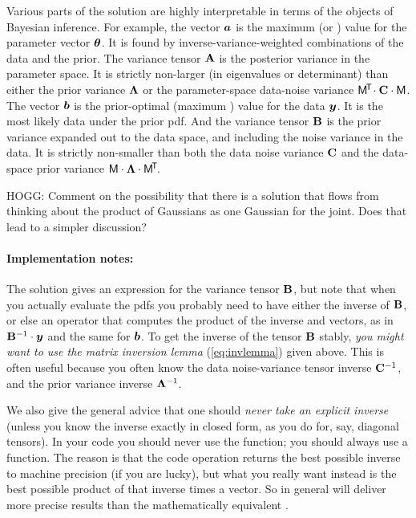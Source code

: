 Various parts of the solution are highly interpretable in terms of the
objects of Bayesian inference. For example, the vector $\boldsymbol{a}$ is the
maximum  (or ) value for the parameter vector
$\boldsymbol{\theta}$.
It is found by inverse-variance-weighted combinations of the data and the prior.
The variance tensor $\mathbf{A}$ is the posterior variance in the parameter space.
It is strictly non-larger (in eigenvalues or determinant) than either
the prior variance $\mathbf{\Lambda}$ or the parameter-space data-noise
variance $\mathsf{M}^{\!\mathsf{T}\!}\cdot\mathbf{C}\cdot\mathsf{M}$.
The vector $\boldsymbol{b}$ is the prior-optimal (maximum )
value for the data $\boldsymbol{y}$.
It is the most likely data under the prior pdf.
And the variance tensor $\mathbf{B}$ is the prior variance expanded out to the
data space, and including the noise variance in the data.
It is strictly non-smaller than both the data noise variance $\mathbf{C}$ and the
data-space prior variance $\mathsf{M}\cdot\mathbf{\Lambda}\cdot\mathsf{M}^{\!\mathsf{T}\!}$.

HOGG: Comment on the possibility that there is a solution that flows
from thinking about the product of Gaussians as one Gaussian for the
joint. Does that lead to a simpler discussion?

\paragraph{Implementation notes:}
The solution gives an expression for the variance tensor $\mathbf{B}$, but
note that when you actually evaluate the pdfs you probably need to
have either the inverse of $\mathbf{B}$, or else an operator that computes
the product of the inverse and vectors, as in $\mathbf{B}^{-1}\cdot\boldsymbol{y}$ and
the same for $\boldsymbol{b}$.
To get the inverse of the tensor $\mathbf{B}$ stably, \emph{you might want to use
the matrix inversion lemma} (\ref{eq:invlemma}) given above.
This is often useful because you often know the data noise-variance
tensor inverse $\mathbf{C}^{-1}$, and the prior variance inverse
$\mathbf{\Lambda}^{-1}$.

We also give the general advice that one should \emph{never take an explicit
inverse} (unless you know the inverse exactly in closed form, as you do
for, say, diagonal tensors).
In your code you should never use the  function; you
should always use a  function.
The reason is that the code operation  returns the best
possible inverse to machine precision (if you are lucky), but what you
really want instead is the best possible product of that inverse times
a vector.
So in general  will deliver more precise results than
the mathematically equivalent .

